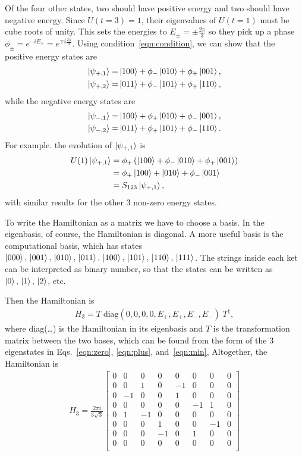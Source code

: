 Of the four other states, two should have positive energy and two should have negative energy. Since $U(t=3)=1$, their eigenvalues of $U(t=1)$ must be cube roots of unity. This sets the energies to $E_\pm = \pm\frac{2\pi}{3}$ so they pick up a phase $\phi_\pm =e^{-iE_\pm} = e^{\mp i\frac{2\pi}{3}}$. Using condition~\ref{eqn:condition}, we can show that the positive energy states are
\begin{align}
\left|\psi_{+,1}\right\rangle=&\left|100\right\rangle + \phi_-\left|010\right\rangle + \phi_+\left|001\right\rangle,\nonumber\\
\left|\psi_{+,2}\right\rangle=&\left|011\right\rangle + \phi_-\left|101\right\rangle + \phi_+\left|110\right\rangle,\label{eqn:plus}
\end{align}
while the negative energy states are 
\begin{align}
\left|\psi_{-,1}\right\rangle=&\left|100\right\rangle + \phi_+\left|010\right\rangle + \phi_-\left|001\right\rangle,\nonumber\\
\left|\psi_{-,2}\right\rangle=&\left|011\right\rangle + \phi_+\left|101\right\rangle + \phi_-\left|110\right\rangle.\label{eqn:min}
\end{align}
For example. the evolution of $\left|\psi_{+,1}\right\rangle$ is
\begin{align}
U(1)\left|\psi_{+,1}\right\rangle &= \phi_+ \left(\left|100\right\rangle + \phi_-\left|010\right\rangle + \phi_+
	\left|001\right\rangle\right)\nonumber\\
&= \phi_+\left|100\right\rangle + \left|010\right\rangle +\phi_- \left|001\right\rangle\nonumber\\
&= S_{123}\left|\psi_{+,1}\right\rangle,
\end{align}
with similar results for the other 3 non-zero energy states.

To write the Hamiltonian as a matrix we have to choose a basis. In the eigenbasis, of course, the Hamiltonian is diagonal. A more useful basis is the computational basis, which has states $\left|000\right\rangle,\,\left|001\right\rangle,\,\left|010\right\rangle,\,\left|011\right\rangle,\,\left|100\right\rangle,\,\left|101\right\rangle,\,\left|110\right\rangle,\,\left|111\right\rangle$. The strings inside each ket can be interpreted as binary number, so that the states can be written as $\left|0\right\rangle,\,\left|1\right\rangle,\,\left|2\right\rangle$, etc.

Then the Hamiltonian is 
\begin{align}
H_3 = T\; \text{diag}(0,0,0,0,E_+,E_+,E_-,E_-)\; T^\dag,
\end{align}
where diag(\dots) is the Hamiltonian in its eigenbasis and $T$ is the transformation matrix between the two bases, which can be found from the form of the 3 eigenstates in Eqs.~\ref{eqn:zero}, \ref{eqn:plus}, and~\ref{eqn:min},
Altogether, the Hamiltonian is
\begin{align}
H_3 = \frac{2\pi i}{3\sqrt{3}}\begin{bmatrix}
0 & 0  & 0  & 0  & 0  & 0  & 0  & 0 \\
0 & 0  & 1  & 0  & -1 & 0  & 0  & 0 \\
0 & -1 & 0  & 0  & 1  & 0  & 0  & 0 \\
0 & 0  & 0  & 0  & 0  & -1 & 1  & 0 \\
0 & 1  & -1 & 0  & 0  & 0  & 0  & 0 \\
0 & 0  & 0  & 1  & 0  & 0  & -1 & 0 \\
0 & 0  & 0  & -1 & 0  & 1  & 0  & 0 \\
0 & 0  & 0  & 0  & 0  & 0  & 0  & 0 \\
\end{bmatrix}\label{eqn:3ham}
\end{align}

